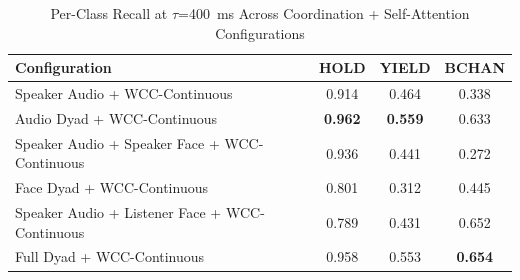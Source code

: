 \begin{table}[h]
\caption{Per-Class Recall at $\tau$=400~ms Across Coordination + Self-Attention Configurations}
\label{tab:recall_per_class_csa}
\small
\renewcommand{\arraystretch}{1.20}
\begin{tabular}{>{\raggedright\arraybackslash}p{4cm}ccc}
\toprule
Configuration & HOLD & YIELD & BCHAN \\
\midrule
Speaker Audio + WCC-Continuous & 0.914 & 0.464 & 0.338 \\
Audio Dyad + WCC-Continuous & \textbf{0.962} & \textbf{0.559} & 0.633 \\
Speaker Audio + Speaker Face + WCC-Continuous & 0.936 & 0.441 & 0.272 \\
Face Dyad + WCC-Continuous & 0.801 & 0.312 & 0.445 \\
Speaker Audio + Listener Face + WCC-Continuous & 0.789 & 0.431 & 0.652 \\
Full Dyad + WCC-Continuous & 0.958 & 0.553 & \textbf{0.654} \\
\bottomrule
\end{tabular}
\end{table}
